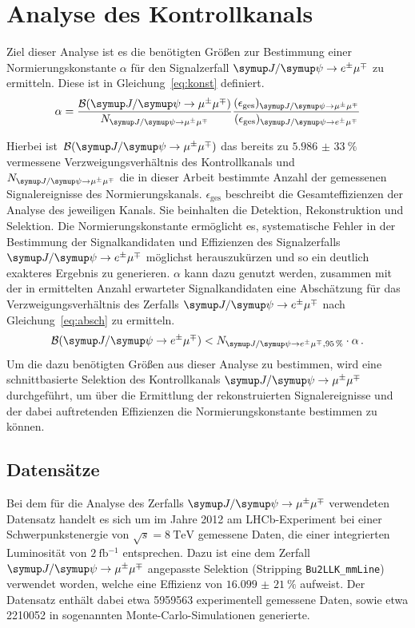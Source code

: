 \chapter{Analyse des Kontrollkanals}
\label{chap:4}
%
Ziel dieser Analyse ist es die benötigten Größen zur Bestimmung einer Normierungskonstante $\alpha$ für den Signalzerfall $\signal$ zu ermitteln. Diese ist in Gleichung~\eqref{eq:konst} definiert.
%
\begin{equation}
  \alpha=\frac{\mathcal{B}(\kontroll)}{N_{\kontroll}}\frac{(\epsilon_{\text{ges}})_{\kontroll}}{(\epsilon_{\text{ges}})_{\signal}}
  \label{eq:konst}
\end{equation}
%

Hierbei ist~$\mathcal{B}(\kontroll)$ das bereits zu $\SI{5,986(33)}{\percent}$ \cite{pdg} vermessene Verzweigungsverhältnis des Kontrollkanals und~$N_{\kontroll}$ die in dieser Arbeit bestimmte Anzahl der gemessenen Signalereignisse des Normierungskanals.
$\epsilon_{\text{ges}}$ beschreibt die Gesamteffizienzen der Analyse des jeweiligen Kanals. Sie beinhalten die Detektion,
Rekonstruktion und Selektion. Die Normierungskonstante ermöglicht es, systematische Fehler in der Bestimmung der
Signalkandidaten und Effizienzen des Signalzerfalls $\signal$ möglichst herauszukürzen und so ein deutlich exakteres Ergebnis
zu generieren. $\alpha$ kann dazu genutzt werden, zusammen mit der in \cite{ba-maik} ermittelten Anzahl erwarteter
Signalkandidaten eine Abschätzung für das Verzweigungsverhältnis des Zerfalls $\signal$ nach Gleichung~\eqref{eq:absch} zu ermitteln.
%
\begin{equation}
  \mathcal{B}(\signal)<N_{\signal, \SI{95}{\percent}}\cdot\alpha\, .
  \label{eq:absch}
\end{equation}
%
Um die dazu benötigten Größen aus dieser Analyse zu bestimmen, wird eine schnittbasierte Selektion des Kontrollkanals
$\kontroll$ durchgeführt, um über die Ermittlung der rekonstruierten Signalereignisse und der dabei auftretenden Effizienzen
die Normierungskonstante bestimmen zu können.

\section{Datensätze}
%
Bei dem für die Analyse des Zerfalls $\kontroll$ verwendeten Datensatz handelt es sich um im Jahre 2012 am LHCb-Experiment bei  einer Schwerpunkstenergie von $\sqrt{s}=\SI{8}{\tera\electronvolt}$ gemessene Daten, die einer integrierten Luminosität von $\SI{2}{\femto\barn^{-1}}$ entsprechen. Dazu ist eine dem Zerfall $\kontroll$ angepasste Selektion (Stripping \texttt{Bu2LLK\_mmLine}) verwendet worden, welche eine Effizienz von $\SI{16,099(21)}{\percent}$ aufweist. Der Datensatz enthält dabei etwa 5959563 experimentell gemessene Daten, sowie etwa 2210052 in sogenannten Monte-Carlo-Simulationen generierte.\\


